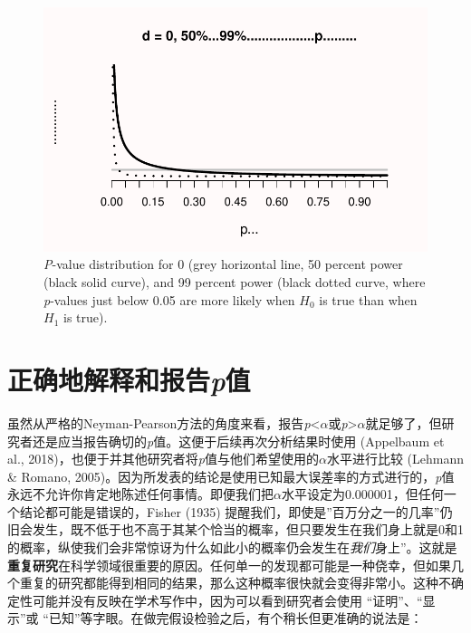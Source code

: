 \documentclass[
  letterpaper,
  DIV=11,
  numbers=noendperiod]{scrreprt}
\begin{document}
\begin{figure}

{\centering \includegraphics[width=1\textwidth,height=\textheight]{01-pvalue_files/figure-pdf/fig-paradox-1.pdf}

}

\caption{\label{fig-paradox}\emph{P}-value distribution for 0 (grey
horizontal line, 50 percent power (black solid curve), and 99 percent
power (black dotted curve, where \emph{p}-values just below 0.05 are
more likely when \(H_0\) is true than when \(H_1\) is true).}

\end{figure}

\hypertarget{sec-correctlyinterpreting}{%
\section{\texorpdfstring{正确地解释和报告\emph{p}值}{正确地解释和报告p值}}\label{sec-correctlyinterpreting}}

虽然从严格的Neyman-Pearson方法的角度来看，报告\emph{p}\textless{}\(\alpha\)或\emph{p}\textgreater{}\(\alpha\)就足够了，但研究者还是应当报告确切的\emph{p}值。这便于后续再次分析结果时使用
(Appelbaum et al.,
2018)，也便于并其他研究者将\emph{p}值与他们希望使用的\(\alpha\)水平进行比较
(Lehmann \& Romano,
2005)。因为所发表的结论是使用已知最大误差率的方式进行的，\emph{p}值永远不允许你肯定地陈述任何事情。即便我们把\(\alpha\)水平设定为0.000001，但任何一个结论都可能是错误的，Fisher
(1935)
提醒我们，即使是''百万分之一的几率''仍旧会发生，既不低于也不高于其某个恰当的概率，但只要发生在我们身上就是0和1的概率，纵使我们会非常惊讶为什么如此小的概率仍会发生在\emph{我们}身上''。这就是\textbf{重复研究}在科学领域很重要的原因。任何单一的发现都可能是一种侥幸，但如果几个重复的研究都能得到相同的结果，那么这种概率很快就会变得非常小。这种不确定性可能并没有反映在学术写作中，因为可以看到研究者会使用
``证明''、``显示''或
``已知''等字眼。在做完假设检验之后，有个稍长但更准确的说法是：
\end{document}
